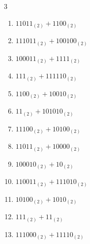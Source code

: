 \begin{multicols}{3}
\begin{enumerate}

  \item $11011_{(2)} + 1100_{(2)}$


  \item $111011_{(2)} + 100100_{(2)}$


  \item $100011_{(2)} + 1111_{(2)}$


  \item $111_{(2)} + 111110_{(2)}$


\columnbreak %

  \item $1100_{(2)} + 10010_{(2)}$


  \item $11_{(2)} + 101010_{(2)}$


  \item $11100_{(2)} + 10100_{(2)}$


  \item $11011_{(2)} + 10000_{(2)}$


  \item $100010_{(2)} + 10_{(2)}$


  \item $110011_{(2)} + 111010_{(2)}$


  \item $10100_{(2)} + 1010_{(2)}$


  \item $111_{(2)} + 11_{(2)}$


  \item $111000_{(2)} + 11110_{(2)}$



\end{enumerate}
\end{multicols}
